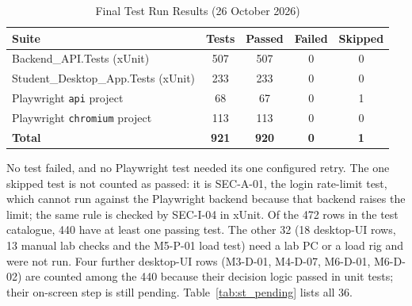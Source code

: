 \begin{table}[H]
\centering
\caption{Final Test Run Results (26 October 2026)}
\label{tab:test_summary}
\vspace{4pt}
{\small\setlength{\doublerulesep}{1pt}
\begin{tabular}{@{}p{6.4cm}cccc@{}}
\hline\hline
\textbf{Suite} & \textbf{Tests} & \textbf{Passed} & \textbf{Failed} & \textbf{Skipped} \\ \hline
Backend\_API.Tests (xUnit) & 507 & 507 & 0 & 0 \\
Student\_Desktop\_App.Tests (xUnit) & 233 & 233 & 0 & 0 \\
Playwright \texttt{api} project & 68 & 67 & 0 & 1 \\
Playwright \texttt{chromium} project & 113 & 113 & 0 & 0 \\ \hline
\textbf{Total} & \textbf{921} & \textbf{920} & \textbf{0} & \textbf{1} \\
\hline\hline
\end{tabular}}
\end{table}

No test failed, and no Playwright test needed its one configured retry. The one skipped test is not counted as passed: it is SEC-A-01, the login rate-limit test, which cannot run against the Playwright backend because that backend raises the limit; the same rule is checked by SEC-I-04 in xUnit. Of the 472 rows in the test catalogue, 440 have at least one passing test. The other 32 (18 desktop-UI rows, 13 manual lab checks and the M5-P-01 load test) need a lab PC or a load rig and were not run. Four further desktop-UI rows (M3-D-01, M4-D-07, M6-D-01, M6-D-02) are counted among the 440 because their decision logic passed in unit tests; their on-screen step is still pending. Table~\ref{tab:st_pending} lists all 36.
